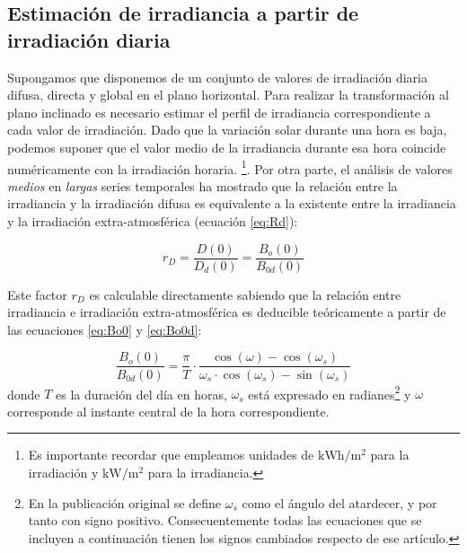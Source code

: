 \subsection{Estimación de irradiancia a partir de irradiación diaria}

Supongamos que disponemos de un conjunto de valores de irradiación diaria
difusa, directa y global en el plano horizontal. Para realizar la
transformación al plano inclinado es necesario estimar el perfil de
irradiancia correspondiente a cada valor de irradiación. Dado que
la variación solar durante una hora es baja, podemos suponer que el
valor medio de la irradiancia durante esa hora coincide numéricamente
con la irradiación horaria.%
\footnote{Es importante recordar que empleamos unidades de $\si{\kWh\per\meter\squared}$
para la irradiación y $\si{\kW\per\meter\squared}$ para la
irradiancia.}. 
Por otra parte, el análisis de valores \emph{medios} en \emph{largas}
series temporales ha mostrado que la relación entre la irradiancia
y la irradiación difusa es equivalente a la existente entre la irradiancia
y la irradiación extra-atmosférica \cite{Collares-Pereira.Rabl1979}
(ecuación \ref{eq:Rd}):

\begin{equation}
r_{D}=\frac{D(0)}{D_{d}(0)}=\frac{B_{o}(0)}{B_{0d}(0)}\label{eq:Rd}\end{equation}

Este factor $r_{D}$ es calculable directamente sabiendo que la relación
entre irradiancia e irradiación extra-atmosférica es deducible teóricamente
a partir de las ecuaciones \ref{eq:Bo0} y \ref{eq:Bo0d}:

\begin{equation}
  \frac{B_{o}(0)}{B_{0d}(0)}=\frac{\pi}{T}\cdot\frac{\cos(\omega)-\cos(\omega_{s})}{\omega_{s}\cdot\cos(\omega_{s})-\sin(\omega_{s})}\label{eq:RelacionExtraAtmosferica}\end{equation}
donde $T$ es la duración del día en horas, $\omega_s$ está expresado en
radianes\footnote{En la publicación original se define $\omega_s$ como el ángulo del atardecer, y por tanto con signo positivo. Consecuentemente todas las ecuaciones que se incluyen a continuación tienen los signos cambiados respecto de ese artículo.} y $\omega$ corresponde
al instante central de la hora correspondiente.

